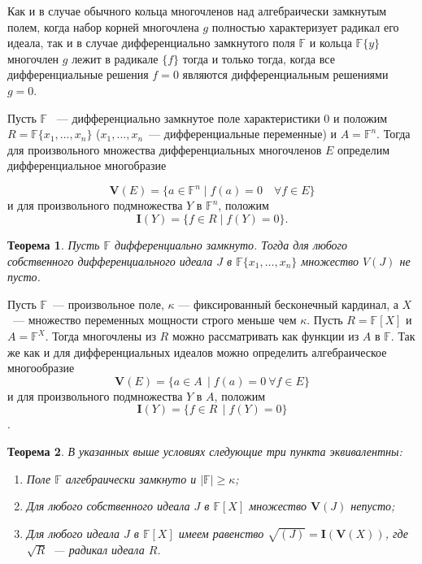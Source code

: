 \documentclass[16pt]{article}
\theoremstyle{plain}
\newtheorem{theorem}{Теорема}
\theoremstyle{definition}
\theoremstyle{remark}
\begin{document}
Как и в случае обычного кольца многочленов над алгебраически
замкнутым полем, когда набор корней многочлена $g$ полностью
характеризует радикал его идеала, так и в случае дифференциально
замкнутого поля $\mathbb{F}$ и кольца  $\mathbb{F}\{y\}$ многочлен $g$ лежит в
радикале $\{f\}$ тогда и только тогда, когда все  дифференциальные
решения $f=0$ являются дифференциальным решениями $g=0$.

Пусть $\mathbb{F}$ ~--- дифференциально замкнутое поле характеристики 0 и
положим $R=\mathbb{F}\{x_1,...,x_n\}$ ($x_1,...,x_n$~--- дифференциальные
переменные) и $A=\mathbb{F}^n$. Тогда для произвольного множества
дифференциальных многочленов $E$ определим дифференциальное многобразие

$$
\mathbf{V}(E)=\{a\in \mathbb{F}^n \mid f(a)=0\quad\forall  f\in E\}
$$
и для произвольного подмножества $Y$ в $\mathbb{F}^n$, положим
$$
\mathbf{I}(Y)=\{f \in R \mid f(Y)=0\}.
$$


\begin{theorem}\label{theorem:th 0 for dif}
Пусть $\mathbb{F}$ дифференциально замкнуто. Тогда для любого собственного дифференциального идеала $J$ в
$\mathbb{F}\{x_1,\ldots,x_n\}$  множество $V(J)$ не пусто.\cite[Chapter~IV,
Section~2, Theorem~1]{Kolchin 2}
\end{theorem}

Пусть $\mathbb{F}$~--- произвольное поле, $\kappa$ --- фиксированный
бесконечный кардинал, а $X$~--- множество переменных мощности строго
меньше чем $\kappa$. Пусть $R=\mathbb{F}[X]$ и $A=\mathbb{F}^X$. Тогда многочлены из
$R$ можно рассматривать как функции из $A$ в $\mathbb{F}$. Так же как и для
дифференциальных идеалов можно определить алгебраическое многообразие $$\mathbf{V}(E)=\{a\in A\,
\mid f(a)=0~\forall f\in E\}$$  и для произвольного подмножества $Y$
в $A$, положим
$$\mathbf{I}(Y)=\{f \in R\, \mid f(Y)=0\}$$.

\begin{theorem}\label{theorem:th 0 for alg}
В указанных выше условиях следующие три пункта эквивалентны:


\begin{enumerate}
\item Поле $\mathbb{F}$ алгебраически замкнуто и $|\mathbb{F}|\geqslant\kappa$;

\item Для любого собственного идеала $J$ в $\mathbb{F}[X]$ множество
$\mathbf{V}(J)$ непусто;

\item Для любого идеала $J$ в $\mathbb{F}[X]$ имеем равенство
$\sqrt{(J)}=\mathbf{I}(\mathbf{V}(X))$, где $\sqrt{R}$~--- радикал
идеала $R$.
\end{enumerate}

\end{theorem}
\end{document}
